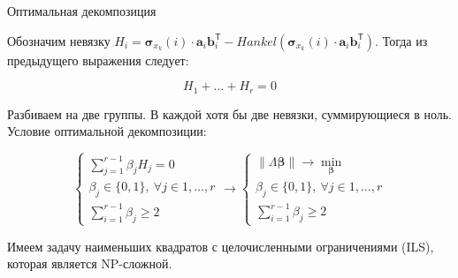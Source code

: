 \documentclass[10pt]{beamer}
\theoremstyle{definition}
\begin{document}
	\begin{frame}{Оптимальная декомпозиция}
		
		Обозначим невязку $ H_i = \boldsymbol{\sigma}_{x_k}(i) \cdot \mathbf{a}_i  \mathbf{b}_i^{\mathsf{T}} - Hankel(\boldsymbol{\sigma}_{x_k}(i) \cdot \mathbf{a}_i  \mathbf{b}_i^{\mathsf{T}}) $. Тогда из предыдущего выражения следует:
		
		\begin{equation*}
			H_1 + \ldots + H_r = 0
		\end{equation*}
			
		Разбиваем на две группы. В каждой хотя бы две невязки, суммирующиеся в ноль. Условие оптимальной декомпозиции:
			
		\begin{equation*}
				\begin{cases*}
					\sum\limits_{j = 1}^{r - 1} \beta_j H_j = 0 \\
					\beta_j \in \{0, 1\}, \ \forall j \in 1, \ldots, r \\
					\sum\limits_{i = 1}^{r - 1} \beta_j \ge 2
				\end{cases*} \to
				\begin{cases*}
					\lVert \Lambda \boldsymbol{\beta} \rVert \to \underset{\boldsymbol{\beta}}{\min} \\
					\beta_j \in \{0, 1\}, \ \forall j \in 1, \ldots, r \\
					\sum\limits_{i = 1}^{r - 1} \beta_j \ge 2
				\end{cases*}
		\end{equation*}
		
		Имеем задачу наименьших квадратов с целочисленными ограничениями (ILS), которая является NP-сложной.
		
	\end{frame}
	
\end{document}
